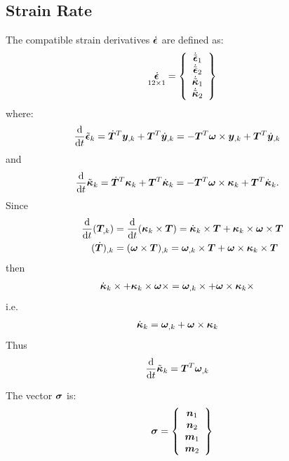 \subsection{Strain Rate}
The compatible strain derivatives $\dot{\T{\epsilon}}$ are defined as:
\begin{equation}
\underset{ 12 \times 1 }{
 \dot{\T{\epsilon}}
 } =
\cubr{\vvect{c}{
 \dot{\tilde{\T{\epsilon}}}_1 \\
 \dot{\tilde{\T{\epsilon}}}_2 \\
 \dot{\tilde{\T{\kappa}}}_1 \\
 \dot{\tilde{\T{\kappa}}}_2 \\
}}
\end{equation}
where:
\begin{align}
	\frac{\mathrm{d}}{\mathrm{d}t} \tilde{\T{\epsilon}}_k
	&=
	\dot{\TT{T}}^T \T{y}_{,k}
	+
	\TT{T}^T \dot{\T{y}}_{,k}
	=
	-\TT{T}^T \T{\omega} \times \T{y}_{,k}
	+
	\TT{T}^T \dot{\T{y}}_{,k}
\end{align}
and
\begin{align}
	\frac{\mathrm{d}}{\mathrm{d}t} \tilde{\T{\kappa}}_k
	&=
	\dot{\TT{T}}^T \T{\kappa}_k
	+
	\TT{T}^T \dot{\T{\kappa}}_k
	=
	-\TT{T}^T \T{\omega} \times \T{\kappa}_k
	+
	\TT{T}^T \dot{\T{\kappa}}_k
	.
\end{align}
Since
\begin{align}
	\frac{\mathrm{d}}{\mathrm{d}t} (\TT{T}_{,k})
	&=
	\frac{\mathrm{d}}{\mathrm{d}t} (\T{\kappa}_k \times \TT{T})
	=
	\dot{\T{\kappa}}_k \times \TT{T}
	+
	\T{\kappa}_k \times \T{\omega} \times \TT{T}
	\\
	(\dot{\TT{T}})_{,k}
	&=
	(\T{\omega} \times \TT{T})_{,k}
	=
	\T{\omega}_{,k} \times \TT{T}
	+
	\T{\omega} \times \T{\kappa}_k \times \TT{T}
\end{align}
then
\begin{align}
	\dot{\T{\kappa}}_k \times + \T{\kappa}_k \times \T{\omega} \times 
	&=
	\T{\omega}_{,k} \times + \T{\omega} \times \T{\kappa}_k \times
\end{align}
i.e.\
\begin{align}
	\dot{\T{\kappa}}_k
	&=
	\T{\omega}_{,k}
	+
	\T{\omega} \times \T{\kappa}_k
\end{align}
Thus
\begin{align}
	\frac{\mathrm{d}}{\mathrm{d}t} \tilde{\T{\kappa}}_k
	&=
	\TT{T}^T \T{\omega}_{,k}
\end{align}

The vector $\T{\sigma}$ is:
\begin{equation}
 \T{\sigma} =
\cubr{\vvect{c}{
 \T{n}_1 \\
 \T{n}_2 \\
 \T{m}_1 \\
 \T{m}_2 \\
}}
\end{equation}
